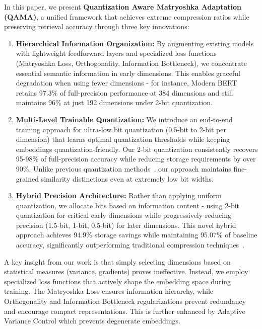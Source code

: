 In this paper, we present \textbf{Quantization Aware Matryoshka Adaptation (QAMA)}, a unified framework that achieves extreme compression ratios while preserving retrieval accuracy through three key innovations:

\begin{enumerate}
    \item \textbf{Hierarchical Information Organization:} By augmenting existing models with lightweight feedforward layers and specialized loss functions (Matryoshka Loss, Orthogonality, Information Bottleneck), we concentrate essential semantic information in early dimensions. This enables graceful degradation when using fewer dimensions - for instance, Modern BERT retains 97.3\% of full-precision performance at 384 dimensions and still maintains 96\% at just 192 dimensions under 2-bit quantization.
    
    \item \textbf{Multi-Level Trainable Quantization:} We introduce an end-to-end training approach for ultra-low bit quantization (0.5-bit to 2-bit per dimension) that learns optimal quantization thresholds while keeping embeddings quantization-friendly. Our 2-bit quantization consistently recovers 95-98\% of full-precision accuracy while reducing storage requirements by over 90\%. Unlike previous quantization methods~\cite{shen2018nash, shu2018compressing}, our approach maintains fine-grained similarity distinctions even at extremely low bit widths.
    
    \item \textbf{Hybrid Precision Architecture:} Rather than applying uniform quantization, we allocate bits based on information content - using 2-bit quantization for critical early dimensions while progressively reducing precision (1.5-bit, 1-bit, 0.5-bit) for later dimensions. This novel hybrid approach achieves 94.9\% storage savings while maintaining 95.07\% of baseline accuracy, significantly outperforming traditional compression techniques~\cite{jaderberg2014speeding, sainath2013low}.
\end{enumerate}

A key insight from our work is that simply selecting dimensions based on statistical measures (variance, gradients) proves ineffective. Instead, we employ specialized loss functions that actively shape the embedding space during training. The Matryoshka Loss ensures information hierarchy, while Orthogonality and Information Bottleneck regularizations prevent redundancy and encourage compact representations. This is further enhanced by Adaptive Variance Control which prevents degenerate embeddings.

